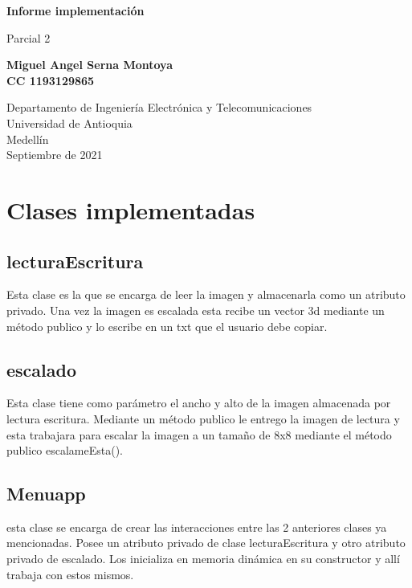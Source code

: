 \documentclass{article}
\begin{document}
\begin{titlepage}
    \begin{center}
        \vspace*{1cm}
            
        \Huge
        \textbf{Informe implementación}
            
        \vspace{0.5cm}
        \LARGE
        Parcial 2
            
        \vspace{1.5cm}
        \textbf{Miguel Angel Serna Montoya\\CC 1193129865}
        
            
        \vfill
            
        \vspace{0.8cm}
            
        \Large
        Departamento de Ingeniería Electrónica y Telecomunicaciones\\
        Universidad de Antioquia\\
        Medellín\\
        Septiembre de 2021
            
    \end{center}
\end{titlepage}

\tableofcontents

\section{Clases implementadas} \label{contenido}
\subsection{lecturaEscritura}
Esta clase es la que se encarga de leer la imagen y almacenarla como un atributo privado. Una vez la imagen
es escalada esta recibe un vector 3d mediante un método publico y lo escribe en un txt que el usuario debe copiar.
\subsection{escalado}
Esta clase tiene como parámetro el ancho y alto de la imagen almacenada por lectura escritura. Mediante un método publico le entrego la imagen de lectura y esta trabajara para escalar la imagen a un tamaño de 8x8 mediante el método publico escalameEsta().
\subsection{Menuapp}
esta clase se encarga de crear las interacciones entre las 2 anteriores clases ya mencionadas. Posee un atributo privado de clase lecturaEscritura y otro atributo privado de escalado. Los inicializa en memoria dinámica en su constructor y allí trabaja con estos mismos.
\newpage
\end{document}
